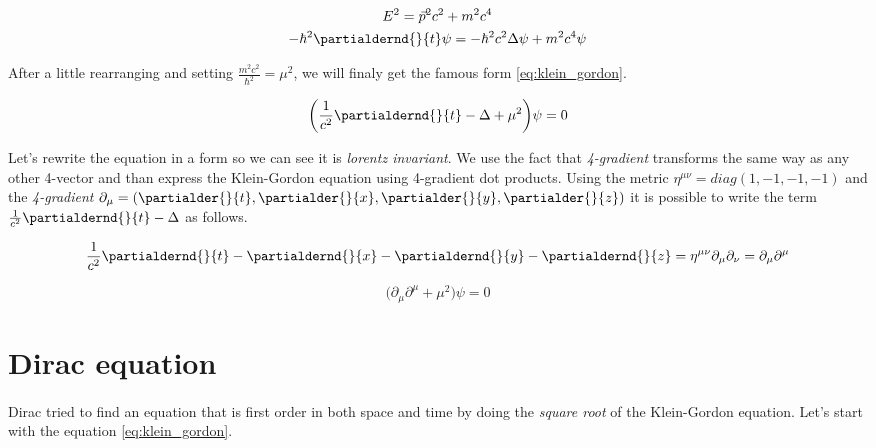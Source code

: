 \begin{equation*}
    \begin{gathered}
        E^{2} = \vec{p}^{2} c^{2} + m^{2} c^{4} \\
        - \hbar^{2} \partialdernd{}{t} \psi = - \hbar^{2} c^{2} \Delta \psi + m^{2} c^{4} \psi
    \end{gathered}
\end{equation*}

After a little rearranging and setting $\frac{m^{2} c^{2}}{\hbar^{2}} = \mu^{2}$, we will finaly get the famous form \ref{eq:klein_gordon}.

\begin{equation}
    \label{eq:klein_gordon}
    \bigg(\frac{1}{c^{2}} \partialdernd{}{t} - \Delta + \mu^{2} \bigg) \psi = 0
\end{equation}

Let's rewrite the equation in a form so we can see it is \textit{lorentz invariant}. We use the fact that \textit{4-gradient}
transforms the same way as any other 4-vector and than express the Klein-Gordon equation using 4-gradient dot products.
Using the metric $\eta^{\mu \nu} = diag(1, -1, -1, -1)$ and the \textit{4-gradient} $\partial_{\mu} = (\partialder{}{t}, \partialder{}{x}, \partialder{}{y}, \partialder{}{z})$ 
it is possible to write the term $\frac{1}{c^{2}} \partialdernd{}{t} - \Delta$ as follows.

\begin{equation*}
     \frac{1}{c^{2}} \partialdernd{}{t} - \partialdernd{}{x} - \partialdernd{}{y} - \partialdernd{}{z} = \eta^{\mu \nu} \partial_{\mu} \partial_{\nu} = \partial_{\mu} \partial^{\mu}
\end{equation*}

\begin{equation}
    \bigg(\partial_{\mu} \partial^{\mu} + \mu^{2} \bigg) \psi = 0
\end{equation}

\section{Dirac equation}

\paragraph{} Dirac tried to find an equation that is first order in both space and time by doing the \textit{square root} 
of the Klein-Gordon equation. Let's start with the equation \ref{eq:klein_gordon}.

